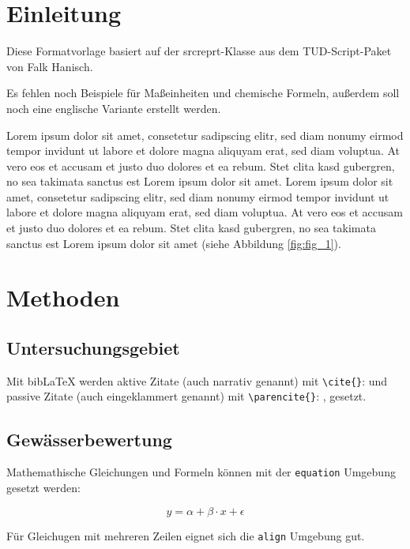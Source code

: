 \documentclass[english,ngerman,BCOR=6mm,cdgeometry=no,DIV=13]{tudscrreprt}
\begin{document}
\chapter{Einleitung}

Diese Formatvorlage basiert auf der srcreprt-Klasse aus dem TUD-Script-Paket von
Falk Hanisch.

Es fehlen noch Beispiele für Maßeinheiten und chemische Formeln, außerdem soll
noch eine englische Variante erstellt werden.


Lorem ipsum dolor sit amet, consetetur sadipscing elitr, sed diam nonumy eirmod
tempor invidunt ut labore et dolore magna aliquyam erat, sed diam voluptua. At
vero eos et accusam et justo duo dolores et ea rebum. Stet clita kasd gubergren,
no sea takimata sanctus est Lorem ipsum dolor sit amet. Lorem ipsum dolor sit
amet, consetetur sadipscing elitr, sed diam nonumy eirmod tempor invidunt ut
labore et dolore magna aliquyam erat, sed diam voluptua. At vero eos et accusam
et justo duo dolores et ea rebum. Stet clita kasd gubergren, no sea takimata
sanctus est Lorem ipsum dolor sit amet (siehe Abbildung \ref{fig:fig_1}).

\chapter{Methoden}

\section{Untersuchungsgebiet}

Mit bibLaTeX werden aktive Zitate (auch narrativ genannt) mit \texttt{\textbackslash cite\{\}}: \cite{r-core-2024} und passive Zitate (auch eingeklammert genannt) mit \texttt{\textbackslash parencite\{\}}: \parencite{r-core-2024}, gesetzt.

\section{Gewässerbewertung}

Mathemathische Gleichungen und Formeln können mit der \texttt{equation} Umgebung gesetzt werden:

\begin{equation}
	y = \alpha + \beta \cdot x + \epsilon
\end{equation}

Für Gleichugen mit mehreren Zeilen eignet sich die \texttt{align} Umgebung gut.
\end{document}
